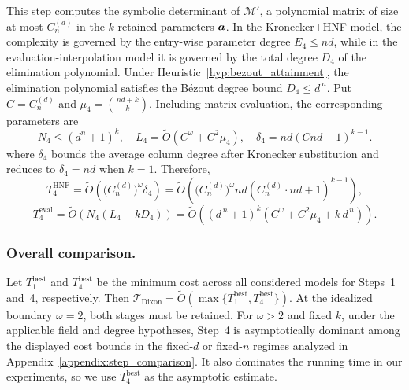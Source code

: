 This step computes the symbolic determinant of $\mathcal{M}'$, a polynomial matrix of size at most $C_n^{(d)}$ in the $k$ retained parameters ${\boldsymbol{a}}$. In the Kronecker$+$HNF model, the complexity is governed by the entry-wise parameter degree $E_4\le nd$, while in the evaluation-interpolation model it is governed by the total degree $D_4$ of the elimination polynomial.
Under Heuristic~\ref{hyp:bezout_attainment}, the elimination polynomial satisfies the B\'ezout degree bound
$
D_4 \le d^{\,n}.
$
Put $C=C_n^{(d)}$ and $\mu_4=\binom{nd+k}{k}$. Including matrix evaluation, the corresponding parameters are
\begin{equation}
 N_4\le(d^n+1)^k,\quad
 L_4=\widetilde O(C^\omega+C^2\mu_4),\quad
 \delta_4=nd(Cnd+1)^{k-1}.
 \label{eq:step4_params}
\end{equation}
where $\delta_4$ bounds the average column degree after Kronecker substitution and reduces to $\delta_4=nd$ when $k=1$. Therefore,
\begin{equation}
	T_{4}^{\mathrm{HNF}}
	=
	\widetilde{O}\!\left(\bigl(C_n^{(d)}\bigr)^\omega\delta_4\right)
	=
	\widetilde{O}\!\left(\bigl(C_n^{(d)}\bigr)^\omega nd(C_n^{(d)}\cdot nd+1)^{k-1}\right),
	\label{eq:step4_hnf}
\end{equation}
\begin{equation}
	T_{4}^{\mathrm{eval}}
	=
	\widetilde{O}\!\left(N_4(L_4+kD_4)\right)
	=
	\widetilde{O}\!\left((d^{\,n}+1)^k\left(C^\omega+C^2\mu_4+k\,d^{\,n}\right)\right).
	\label{eq:step4_eval}
\end{equation}

\subsubsection{Overall comparison.}
Let $T_{1}^{\mathrm{best}}$ and $T_{4}^{\mathrm{best}}$ be the minimum cost across all considered models for Steps~1 and~4, respectively. Then
$\mathcal{T}_{\mathrm{Dixon}} = \widetilde{O}(\max\{T_{1}^{\mathrm{best}},T_{4}^{\mathrm{best}}\}).$
At the idealized boundary $\omega=2$, both stages must be retained. For $\omega>2$ and fixed $k$, under the applicable field and degree hypotheses, Step~4 is asymptotically dominant among the displayed cost bounds in the fixed-$d$ or fixed-$n$ regimes analyzed in Appendix~\ref{appendix:step_comparison}. It also dominates the running time in our experiments, so we use $T_{4}^{\mathrm{best}}$ as the asymptotic estimate.

